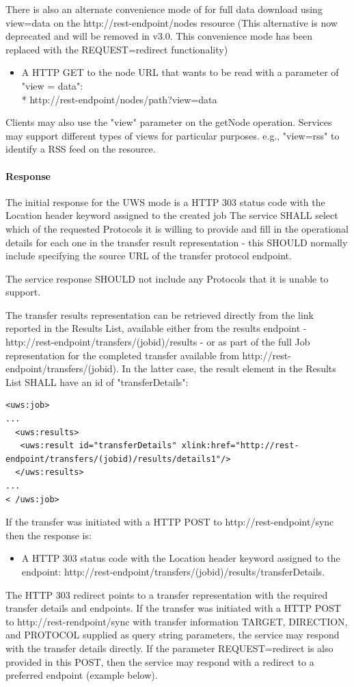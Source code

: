 \documentclass[11pt,a4paper]{ivoa}
\begin{document}
There is also an alternate convenience mode of for full data download using view=data on the http://rest-endpoint/nodes resource (This alternative is now deprecated and will be removed in v3.0.  This convenience mode has been replaced with the REQUEST=redirect functionality)
\begin{itemize}
    \item A HTTP GET to the node URL that wants to be read with a parameter of "view = data": \\*
        http://rest-endpoint/nodes/path?view=data
\end{itemize}

Clients may also use the "view" parameter on the getNode operation. Services may support different types of views for particular purposes. e.g., "view=rss" to identify a RSS feed on the resource.

\paragraph{Response}
The initial response for the UWS mode is a HTTP 303 status code with the Location header keyword assigned to the created job
The service SHALL select which of the requested Protocols it is willing to provide and fill in the operational details for each one in the transfer result representation - this SHOULD normally include specifying the source URL of the transfer protocol endpoint.

The service response SHOULD not include any Protocols that it is unable to support.

The transfer results representation can be retrieved directly from the link reported in the Results List, available either from the results endpoint - http://rest-endpoint/transfers/(jobid)/results - or as part of the full Job representation for the completed transfer available from http://rest-endpoint/transfers/(jobid). In the latter case, the result element in the Results List SHALL have an id of "transferDetails":
\begin{lstlisting}
<uws:job>
...
  <uws:results>
   <uws:result id="transferDetails" xlink:href="http://rest-endpoint/transfers/(jobid)/results/details1"/>
  </uws:results>
...
< /uws:job>
\end{lstlisting}
If the transfer was initiated with a HTTP POST to http://rest-endpoint/sync then the response is:
\begin{itemize}
    \item A HTTP 303 status code with the Location header keyword assigned to the endpoint: http://rest-endpoint/transfers/(jobid)/results/transferDetails.
\end{itemize}
The HTTP 303 redirect points to a transfer representation with the required transfer details and endpoints.
If the transfer was initiated with a HTTP POST to http://rest-rendpoint/sync with transfer information TARGET, DIRECTION, and PROTOCOL supplied as query string parameters, the service may respond with the transfer details directly. If the parameter REQUEST=redirect is also provided in this POST, then the service may respond with a redirect to a preferred endpoint (example below).
\end{document}
